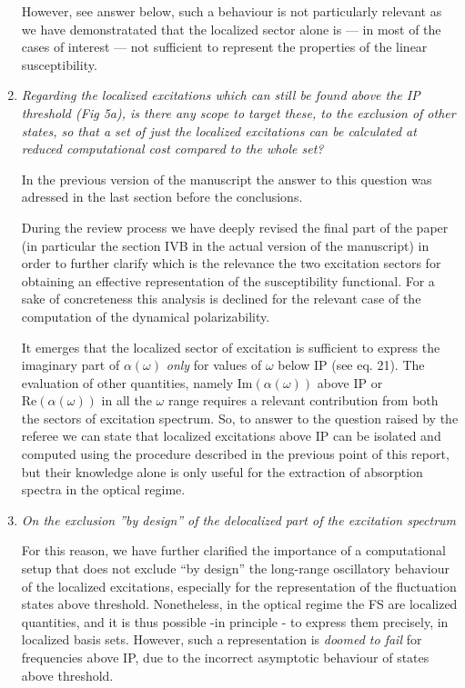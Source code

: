 \documentclass[11pt,a4paper]{article}
\begin{document}
\begin{enumerate}
However, see answer below, such a behaviour is not particularly relevant as we have demonstratated that the
localized sector alone is --- in most of the cases of interest --- not sufficient to represent the properties of the linear susceptibility.

\item \emph{Regarding the localized excitations which can still be found above the IP threshold (Fig 5a), is there any scope to target these, to the
exclusion of other states, so that a set of just the localized excitations can be calculated at reduced computational cost compared to the whole set?}

In the previous version of the manuscript the answer to this question was adressed in the last section before the conclusions.

 During the review process we have deeply revised the final part of the paper (in particular the section IVB in the actual version of the manuscript) in order to further  clarify which is the relevance the two excitation sectors for obtaining an effective representation of the susceptibility functional.
 For a sake of concreteness this analysis is declined for the relevant case of the computation of the dynamical polarizability.

 It emerges that the localized
 sector of excitation is sufficient to express the imaginary part of $\alpha(\omega)$ \emph{only} for values of $\omega$ below IP (see eq. 21). The evaluation of
 other quantities, namely $\mathrm{Im}(\alpha(\omega))$ above IP or $\mathrm{Re}(\alpha(\omega))$ in all the $\omega$ range requires a relevant contribution from
 both the sectors of excitation spectrum. So, to answer to the question raised by the referee we can state that localized excitations above IP can be isolated and computed using the procedure described in the previous point of this report, but their knowledge alone is only useful for the extraction of absorption spectra in the optical regime.

 \item \emph{On the exclusion ''by design'' of the delocalized part of the excitation spectrum}

 For this reason, we have further clarified the
 importance of a computational setup that does not exclude ``by design'' the long-range oscillatory behaviour of the localized excitations, especially for the representation
 of the fluctuation states above threshold.
 Nonetheless, in the optical regime the FS are localized quantities, and it is thus possible -in principle - to express them precisely, in localized basis sets. However, such a representation is \emph{doomed to fail} for frequencies above IP, due to the incorrect asymptotic behaviour of  states above threshold.



\end{enumerate}
\end{document}
